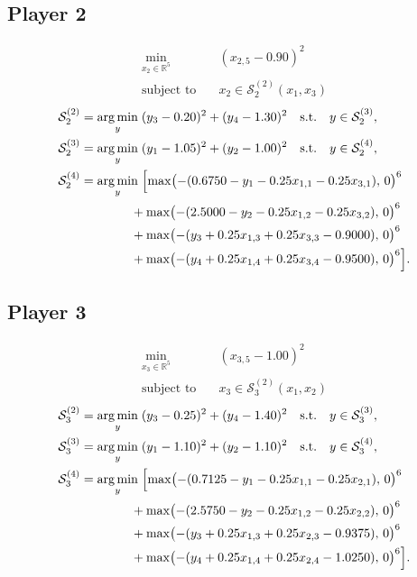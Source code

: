\documentclass[11pt]{article}
\newcommand{\argmin}{\operatorname*{arg\,min}}
\begin{document}
\subsection*{Player 2}
\[
\begin{aligned}
  \min_{x_2 \in \mathbb{R}^5} \quad & (x_{2,5}-0.90)^2 \\
  \text{subject to} \quad & x_2 \in \mathcal{S}_2^{(2)}(x_1,x_3)
\end{aligned}
\]
\[
\begin{aligned}
  \mathcal{S}_2^{(2)} &= \argmin_{y} \;
    (y_3-0.20)^2 + (y_4-1.30)^2
    \quad \text{s.t.} \quad y \in \mathcal{S}_2^{(3)}, \\
  \mathcal{S}_2^{(3)} &= \argmin_{y} \;
    (y_1-1.05)^2 + (y_2-1.00)^2
    \quad \text{s.t.} \quad y \in \mathcal{S}_2^{(4)}, \\
  \mathcal{S}_2^{(4)} &= \argmin_{y} \;
    \Bigl[ \max\bigl(-(0.6750 - y_1 - 0.25x_{1,1} - 0.25x_{3,1}),\,0\bigr)^6 \\
    &\qquad\qquad + \max\bigl(-(2.5000 - y_2 - 0.25x_{1,2} - 0.25x_{3,2}),\,0\bigr)^6 \\
    &\qquad\qquad + \max\bigl(-(y_3 + 0.25x_{1,3} + 0.25x_{3,3} - 0.9000),\,0\bigr)^6 \\
    &\qquad\qquad + \max\bigl(-(y_4 + 0.25x_{1,4} + 0.25x_{3,4} - 0.9500),\,0\bigr)^6 \Bigr].
\end{aligned}
\]

\subsection*{Player 3}
\[
\begin{aligned}
  \min_{x_3 \in \mathbb{R}^5} \quad & (x_{3,5}-1.00)^2 \\
  \text{subject to} \quad & x_3 \in \mathcal{S}_3^{(2)}(x_1,x_2)
\end{aligned}
\]
\[
\begin{aligned}
  \mathcal{S}_3^{(2)} &= \argmin_{y} \;
    (y_3-0.25)^2 + (y_4-1.40)^2
    \quad \text{s.t.} \quad y \in \mathcal{S}_3^{(3)}, \\
  \mathcal{S}_3^{(3)} &= \argmin_{y} \;
    (y_1-1.10)^2 + (y_2-1.10)^2
    \quad \text{s.t.} \quad y \in \mathcal{S}_3^{(4)}, \\
  \mathcal{S}_3^{(4)} &= \argmin_{y} \;
    \Bigl[ \max\bigl(-(0.7125 - y_1 - 0.25x_{1,1} - 0.25x_{2,1}),\,0\bigr)^6 \\
    &\qquad\qquad + \max\bigl(-(2.5750 - y_2 - 0.25x_{1,2} - 0.25x_{2,2}),\,0\bigr)^6 \\
    &\qquad\qquad + \max\bigl(-(y_3 + 0.25x_{1,3} + 0.25x_{2,3} - 0.9375),\,0\bigr)^6 \\
    &\qquad\qquad + \max\bigl(-(y_4 + 0.25x_{1,4} + 0.25x_{2,4} - 1.0250),\,0\bigr)^6 \Bigr].
\end{aligned}
\]
\end{document}
